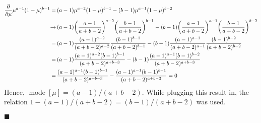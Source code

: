\documentclass[11pt, a4paper]{scrartcl}
\DeclareMathOperator{\mode}{mode}
\newcommand{\eot}{\hfill\(\blacksquare\)}
\begin{document}
			\begin{align}
				\pdv{\mu} \mu^{a - 1} (1 - \mu)^{b - 1}
					=&\, (a - 1) \mu^{a - 2} (1 - \mu)^{b - 1} - (b - 1) \mu^{a - 1} (1 - \mu)^{b - 2} \\
					\to&\, (a - 1) \bigg( \frac{a - 1}{a + b - 2} \bigg)^{a - 2} \bigg( \frac{b - 1}{a + b - 2} \bigg)^{b - 1} - (b - 1) \bigg( \frac{a - 1}{a + b - 2} \bigg)^{a - 1} \bigg( \frac{b - 1}{a + b - 2} \bigg)^{b - 2} \\
					=&\, (a - 1) \frac{(a - 1)^{a - 2}}{(a + b - 2)^{a - 2}} \frac{(b - 1)^{b - 1}}{(a + b - 2)^{b - 1}} - (b - 1) \frac{(a - 1)^{a - 1}}{(a + b - 2)^{a - 1}} \frac{(b - 1)^{b - 2}}{(a + b - 2)^{b - 2}} \\
					=&\, (a - 1) \frac{(a - 1)^{a - 2} (b - 1)^{b - 1}}{(a + b - 2)^{a + b - 3}} - (b - 1) \frac{(a - 1)^{a - 1} (b - 1)^{b - 2}}{(a + b - 2)^{a + b - 3}} \\
					=&\, \frac{(a - 1)^{a - 1} (b - 1)^{b - 1}}{(a + b - 2)^{a + b - 3}} - \frac{(a - 1)^{a - 1} (b - 1)^{b - 1}}{(a + b - 2)^{a + b - 3}}
					 = 0
			\end{align}
			Hence, \( \mode[\mu] = (a - 1)/(a + b - 2) \). While plugging this result in, the relation \( 1 - (a - 1)/(a + b - 2) = (b - 1)/(a + b - 2) \) was used.

			\eot
\end{document}

